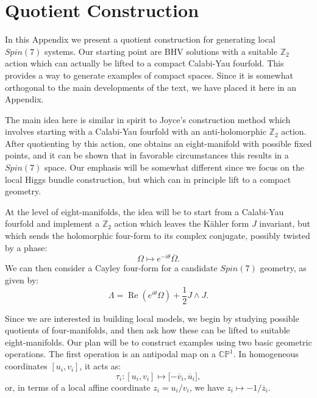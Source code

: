 \documentclass[12pt]{article}%
\numberwithin{equation}{section}
\renewcommand{\(}{\left(}
\renewcommand{\)}{\right)}
\renewcommand{\[}{\left[}
\renewcommand{\]}{\right]}
\begin{document}
\section{Quotient Construction} \label{app:QUOT}

In this Appendix we present a quotient construction for generating local $Spin(7)$ systems. Our starting point are BHV solutions with a suitable $\mathbb{Z}_2$ action which can actually be lifted to a compact Calabi-Yau fourfold. This provides a way to generate examples of compact spaces. Since it is somewhat orthogonal to the main developments of the text, we have placed it here in an Appendix.

The main idea here is similar in spirit to Joyce's construction method \cite{Joyce:1999nk} which involves starting with a Calabi-Yau fourfold with an anti-holomorphic $\mathbb{Z}_2$ action. After quotienting by this action, one obtains an eight-manifold with possible fixed points, and it can be shown that in favorable circumstances this results in a $Spin(7)$ space. Our emphasis will be somewhat different since we focus on the local Higgs bundle construction, but which can in principle lift to a compact geometry.

At the level of eight-manifolds, the idea will be to start from a
Calabi-Yau fourfold and implement a $\mathbb{Z}_{2}$ action which leaves the K\"ahler
form $J$ invariant, but which sends the holomorphic four-form to its complex
conjugate, possibly twisted by a phase:%
\begin{equation}
\Omega\mapsto e^{-i\theta}\overline{\Omega}.
\end{equation}
We can then consider a Cayley four-form for a candidate $Spin(7)$ geometry, as
given by:%
\begin{equation}
\Lambda=\operatorname{Re}\left(  e^{i\theta}\Omega\right)  + \frac{1}{2} J\wedge J.
\end{equation}

Since we are interested in building local models, we begin by studying possible quotients of four-manifolds, and then ask how these
can be lifted to suitable eight-manifolds. Our plan will be to construct examples using two basic geometric operations.
The first operation is an antipodal map on a $\mathbb{CP}^{1}$. In homogeneous
coordinates $[u_{i},v_{i}]$, it acts as:%
\begin{equation}
\tau_{i}:[u_{i},v_{i}]\mapsto\lbrack-\overline{v}_{i},\overline{u}_{i}],
\end{equation}
or, in terms of a local affine coordinate $z_{i}=u_{i}/v_{i}$, we have
$z_{i}\mapsto-1/\overline{z}_{i}$.
\end{document}
